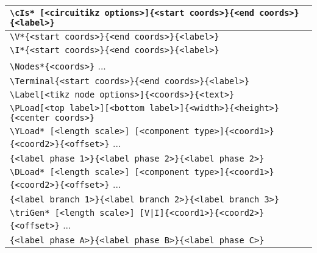 \documentclass[a4paper,12pt]{article}
\begin{document}
\begin{center}
\begin{tabular}{l}
        \texttt{\textbackslash cIs* [\textless circuitikz options\textgreater]\{\textless start coords\textgreater\}\{\textless end coords\textgreater\}\{\textless label\textgreater\}}  \\
        \hline
        \texttt{\textbackslash V*\{\textless start coords\textgreater\}\{\textless end coords\textgreater\}\{\textless label\textgreater\}}  \\
        \texttt{\textbackslash I*\{\textless start coords\textgreater\}\{\textless end coords\textgreater\}\{\textless label\textgreater\}}  \\
        \hline
        \texttt{\textbackslash Nodes*\{\textless coords\textgreater\}} ... \\
        \texttt{\textbackslash Terminal\{\textless start coords\textgreater\}\{\textless end coords\textgreater\}\{\textless label\textgreater\}}  \\
        \texttt{\textbackslash Label[\textless tikz node options\textgreater]\{\textless coords\textgreater\}\{\textless text\textgreater\}}  \\
        \hline
        \texttt{\textbackslash PLoad[\textless top label\textgreater][\textless bottom label\textgreater]\{\textless width\textgreater\}\{\textless height\textgreater\}\{\textless center coords\textgreater\}} \\
        \hline
        \texttt{\textbackslash YLoad* [\textless length scale\textgreater] [\textless component type\textgreater]\{\textless coord1\textgreater\}\{\textless coord2\textgreater\}\{\textless offset\textgreater\}} ... \\
        \qquad\qquad\texttt{\{\textless label phase 1\textgreater\}\{\textless label phase 2\textgreater\}\{\textless label phase 2\textgreater\}} \\
        \texttt{\textbackslash DLoad* [\textless length scale\textgreater] [\textless component type\textgreater]\{\textless coord1\textgreater\}\{\textless coord2\textgreater\}\{\textless offset\textgreater\}} ...\\
        \qquad\qquad\texttt{\{\textless label branch 1\textgreater\}\{\textless label branch 2\textgreater\}\{\textless label branch 3\textgreater\}} \\
        \hline
        \texttt{\textbackslash triGen*  [\textless length scale\textgreater] [V|I]\{\textless coord1\textgreater\}\{\textless coord2\textgreater\}\{\textless offset\textgreater\}} ...\\
        \qquad\qquad\texttt{\{\textless label phase A\textgreater\}\{\textless label phase B\textgreater\}\{\textless label phase C\textgreater\}} \\

\end{tabular}
\end{center}
\end{document}
